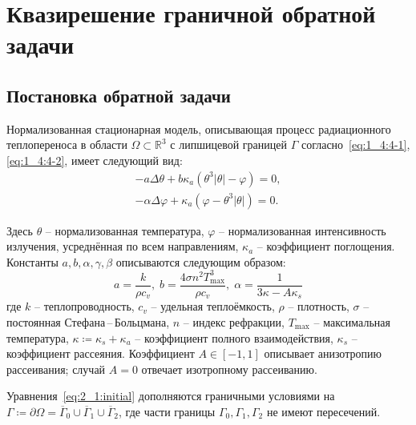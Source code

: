 \section{Квазирешение граничной обратной задачи}\label{sec:ch2/sec1}

\subsection{Постановка обратной задачи}\label{subsec:ch2/sec1/subsec1}

Нормализованная стационарная модель, описывающая процесс радиационного теплопереноса в
области $\Omega \subset \mathbb{R}^3$ с липшицевой границей $\Gamma$
согласно~\eqref{eq:1_4:4-1},\eqref{eq:1_4:4-2}, имеет следующий вид:
\begin{equation}
    \label{eq:2_1:initial}
    \begin{aligned}
        - a \Delta \theta + b \kappa_a(\theta ^ 3 | \theta | - \varphi) = 0,  \\
        - \alpha \Delta \varphi + \kappa_a (\varphi - \theta ^3 | \theta |) = 0.
    \end{aligned}
\end{equation}

Здесь $\theta$ -- нормализованная температура, $\varphi$ -- нормализованная интенсивность излучения,
усреднённая по всем направлениям, $\kappa_a$ -- коэффициент поглощения.
Константы $a, b, \alpha, \gamma, \beta$ описываются следующим образом:
\[
    a = \frac{k}{\rho c_v}, \; b = \frac{4 \sigma n^2 T^3_{\max}}{\rho c_v}, \;
    \alpha = \frac{1}{3\kappa -A \kappa_s}
\]
где $k$ -- теплопроводность, $c_v$ -- удельная теплоёмкость, $\rho$ -- плотность,
$\sigma$ -- постоянная Стефана\,--\,Больцмана, $n$ -- индекс рефракции,
$T_{\max}$ -- максимальная температура,
$\kappa \coloneqq \kappa_s + \kappa_a$ -- коэффициент полного взаимодействия,
$\kappa_s$ -- коэффициент рассеяния.
Коэффициент $A \in [-1,1]$ описывает анизотропию рассеивания;
случай $A=0$ отвечает изотропному рассеиванию.

Уравнения~\eqref{eq:2_1:initial} дополняются граничными условиями на
$\Gamma \coloneqq \partial \Omega =\overline{\Gamma}_0 \cup \overline{\Gamma}_1 \cup \overline{\Gamma}_2$,
где части границы $\Gamma_0, \Gamma_1, \Gamma_2$ не имеют пересечений.

